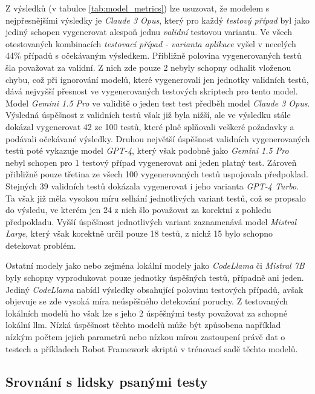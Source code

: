 \documentclass[czech, ma, kiv, he, iso690numb, pdf, viewonly]{fasthesis}
\begin{document}
        Z výsledků (v tabulce \ref{tab:model_metrics}) lze usuzovat, že modelem s nejpřesnějšími výsledky je \textit{Claude 3 Opus}, který pro každý \textit{testový případ} byl jako jediný schopen vygenerovat alespoň jednu \textit{validní} testovou variantu. Ve všech otestovaných kombinacích \textit{testovací případ - varianta aplikace} vyšel v necelých 44\% případů s očekávaným výsledkem. Přibližně polovina vygenerovaných testů šla považovat za validní. Z nich zde pouze 2 nebyly schopny odhalit vloženou chybu, což při ignorování modelů, které vygenerovali jen jednotky validních testů, dává nejvyšší přesnost ve vygenerovaných testových skriptech pro tento model. Model \textit{Gemini 1.5 Pro} ve validitě o jeden test test předběh model \textit{Claude 3 Opus}. Výsledná úspěšnost z validních testů však již byla nižší, ale ve výsledku stále dokázal vygenerovat 42 ze 100 testů, které plně splňovali veškeré požadavky a podávali očekávané výsledky. Druhou největší úspěšnost validních vygenerovaných testů poté vykazuje model \textit{GPT-4}, který však podobně jako \textit{Gemini 1.5 Pro} nebyl schopen pro 1 testový případ vygenerovat ani jeden platný test. Zároveň přibližně pouze třetina ze všech 100 vygenerovaných testů uspojovala předpoklad. Stejných 39 validních testů dokázala vygenerovat i jeho varianta \textit{GPT-4 Turbo}. Ta však již měla vysokou míru selhání jednotlivých variant testů, což se propsalo do výsledu, ve kterém jen 24 z nich šlo považovat za korektní z pohledu předpokladu. Vyšší úspěšnost jednotlivých variant zaznamenává model \textit{Mistral Large}, který však korektně určil pouze 18 testů, z nichž 15 bylo schopno detekovat problém.

        Ostatní modely jako  nebo zejména lokální modely jako \textit{CodeLlama} či \textit{Mistral 7B} byly schopny vyprodukovat pouze jednotky úspěšných testů, případně ani jeden. Jediný \textit{CodeLlama} nabídl výsledky obsahující polovinu testových případů, avšak objevuje se zde vysoká míra neúspěšného detekování poruchy. Z testovaných lokálních modelů ho však lze s jeho 2 úspěšnými testy považovat za schopné lokální \Gls{llm}. Nízká úspěšnost těchto modelů může být způsobena například nízkým počtem jejich parametrů nebo nízkou mírou zastoupení právě dat o testech a příkladech Robot Framework skriptů v trénovací sadě těchto modelů.

        \subsection{Srovnání s lidsky psanými testy}
\end{document}
